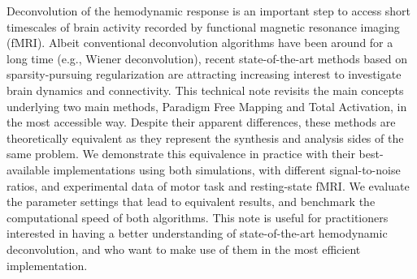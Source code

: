 Deconvolution of the hemodynamic response is an important step to access short timescales of brain activity recorded by functional magnetic resonance imaging (fMRI). Albeit conventional deconvolution algorithms have been around for a long time (e.g., Wiener deconvolution), recent state-of-the-art methods based on sparsity-pursuing regularization are attracting increasing interest to investigate brain dynamics and connectivity. This technical note revisits the main concepts underlying two main methods, Paradigm Free Mapping and Total Activation, in the most accessible way. Despite their apparent differences, these methods are theoretically equivalent as they represent the synthesis and analysis sides of the same problem. We demonstrate this equivalence in practice with their best-available implementations using both simulations, with different signal-to-noise ratios, and experimental data of motor task and resting-state fMRI. We evaluate the parameter settings that lead to equivalent results, and benchmark the computational speed of both algorithms. This note is useful for practitioners interested in having a better understanding of state-of-the-art hemodynamic deconvolution, and who want to make use of them in the most efficient implementation.
